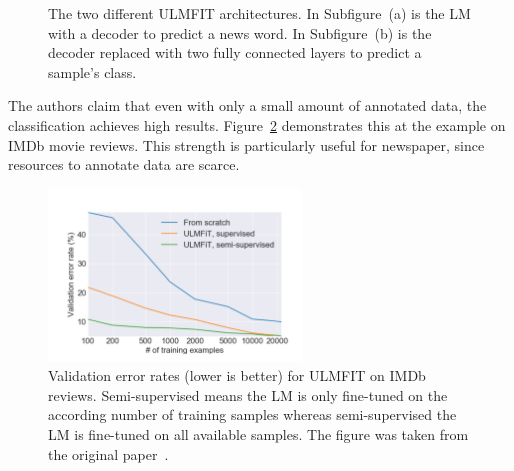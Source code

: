 \begin{figure}
    \centering
    \caption{The two different ULMFIT architectures. In Subfigure~(a) is the LM with a decoder to predict a news word. In Subfigure~(b) is the decoder replaced with two fully connected layers to predict a sample's class.}
    \label{fig:ulmfit_archi}
\end{figure}

The authors claim that even with only a small amount of annotated data, the classification achieves high results. Figure~\ref{fig:bgrd_ulmfit_res} demonstrates this at the example on IMDb movie reviews. This strength is particularly useful for newspaper, since resources to annotate data are scarce.

\begin{figure}
  \begin{center}
    \includegraphics[width=0.6\textwidth]{images/background/ulmfit_results.png}
  \end{center}
  \caption{Validation error rates (lower is better) for ULMFIT on IMDb reviews. Semi-supervised means the LM is only fine-tuned on the according number of training samples whereas semi-supervised the LM is fine-tuned on all available samples. The figure was taken from the original paper~\cite{howard2018universal}.}
   \label{fig:bgrd_ulmfit_res}
\end{figure}

